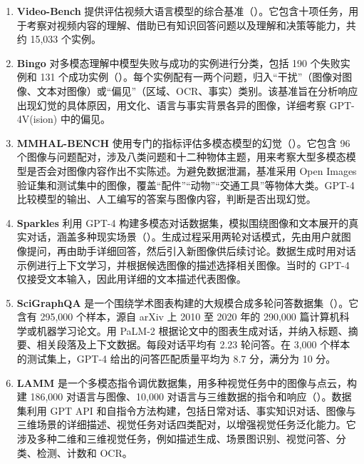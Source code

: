 \begin{enumerate}
\item \textbf{Video-Bench} 提供评估视频大语言模型的综合基准（）。它包含十项任务，用于考察对视频内容的理解、借助已有知识回答问题以及理解和决策等能力，共约 15,033 个实例。

\item \textbf{Bingo} 对多模态理解中模型失败与成功的实例进行分类，包括 190 个失败实例和 131 个成功实例（）。每个实例配有一两个问题，归入“干扰”（图像对图像、文本对图像）或“偏见”（区域、OCR、事实）类别。该基准旨在分析响应出现幻觉的具体原因，用文化、语言与事实背景各异的图像，详细考察 GPT-4V(ision) 中的偏见。

\item \textbf{MMHAL-BENCH} 使用专门的指标评估多模态模型的幻觉（）。它包含 96 个图像与问题配对，涉及八类问题和十二种物体主题，用来考察大型多模态模型是否会对图像内容作出不实陈述。为避免数据泄漏，基准采用 Open Images 验证集和测试集中的图像，覆盖“配件”“动物”“交通工具”等物体大类。GPT-4 比较模型的输出、人工编写的答案与图像内容，判断是否出现幻觉。

\item \textbf{Sparkles} 利用 GPT-4 构建多模态对话数据集，模拟围绕图像和文本展开的真实对话，涵盖多种现实场景（）。生成过程采用两轮对话模式，先由用户就图像提问，再由助手详细回答，然后引入新图像供后续讨论。数据生成时用对话示例进行上下文学习，并根据候选图像的描述选择相关图像。当时的 GPT-4 仅接受文本输入，因此用详细的文本描述代表图像。

\item \textbf{SciGraphQA} 是一个围绕学术图表构建的大规模合成多轮问答数据集（）。它含有 295,000 个样本，源自 arXiv 上 2010 至 2020 年的 290,000 篇计算机科学或机器学习论文。用 PaLM-2 根据论文中的图表生成对话，并纳入标题、摘要、相关段落及上下文数据。每段对话平均有 2.23 轮问答。在 3,000 个样本的测试集上，GPT-4 给出的问答匹配质量平均为 8.7 分，满分为 10 分。

\item \textbf{LAMM} 是一个多模态指令调优数据集，用多种视觉任务中的图像与点云，构建 186,000 对语言与图像、10,000 对语言与三维数据的指令和响应（）。数据集利用 GPT API 和自指令方法构建，包括日常对话、事实知识对话、图像与三维场景的详细描述、视觉任务对话四类配对，以增强视觉任务泛化能力。它涉及多种二维和三维视觉任务，例如描述生成、场景图识别、视觉问答、分类、检测、计数和 OCR。
\end{enumerate}
